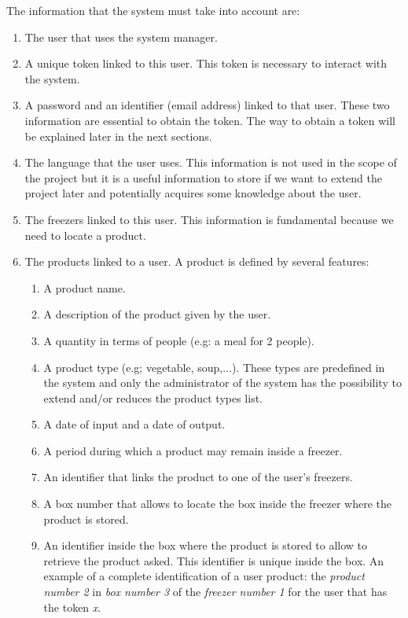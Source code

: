 The information that the system must take into account are:
\begin{enumerate}
\item The user that uses the system manager.
\item A unique token linked to this user. This token is necessary to interact with the system.
\item A password and an identifier (email address) linked to that user. These two information are essential to obtain the token. The way to obtain a token will be explained later in the next sections.
\item The language that the user uses. This information is not used in the scope of the project but it is a useful information to store if we want to extend the project later and potentially acquires some knowledge about the user.
\item The freezers linked to this user. This information is fundamental because we need to locate a product.
\item The products linked to a user. A product is defined by several features: 
\begin{enumerate}
\item A product name.
\item A description of the product given by the user.
\item A quantity in terms of people (e.g: a meal for 2 people).
\item A product type (e.g; vegetable, soup,...). These types are predefined in the system and only the administrator of the system has the possibility to extend and/or reduces the product types list.
\item A date of input and a date of output.
\item A period during which a product may remain inside a freezer.
\item An identifier that links the product to one of the user's freezers.
\item A box number that allows to locate the box inside the freezer where the  product is stored.
\item An identifier inside the box where the product is stored to allow to retrieve the product asked. This identifier is unique inside the box. An example of a complete identification of a user product: the \textit{product number 2} in \textit{box number 3} of the \textit{freezer number 1} for the user that has the token \textit{x}.
\end{enumerate}
\end{enumerate}

